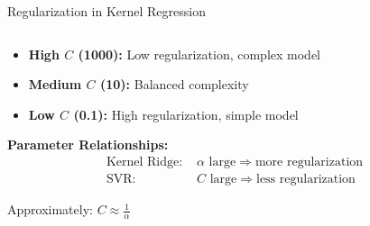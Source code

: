 \documentclass[8pt,aspectratio=1610]{beamer}
\begin{document}
\begin{frame}{Regularization in Kernel Regression}
\begin{columns}[t]
\begin{column}{0.48\textwidth}
\begin{itemize}
\setlength{\itemsep}{1pt}
\item \textbf{High $C$ (1000):} Low regularization, complex model
\item \textbf{Medium $C$ (10):} Balanced complexity
\item \textbf{Low $C$ (0.1):} High regularization, simple model
\end{itemize}

\vspace{0.3cm}
\textbf{Parameter Relationships:}
\begin{align}
\text{Kernel Ridge: } &\alpha \text{ large} \Rightarrow \text{more regularization} \\
\text{SVR: } &C \text{ large} \Rightarrow \text{less regularization}
\end{align}

\vspace{0.2cm}
Approximately: $C \approx \frac{1}{\alpha}$
\end{column}
\end{columns}
\end{frame}
\end{document}
